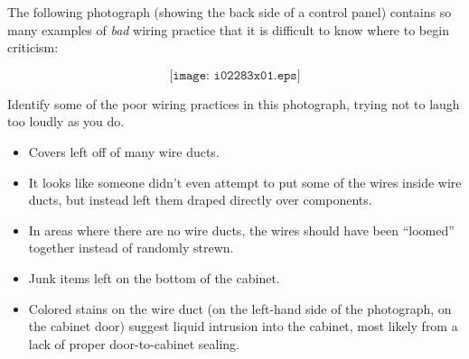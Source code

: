 

The following photograph (showing the back side of a control panel) contains so many examples of {\it bad} wiring practice that it is difficult to know where to begin criticism:

$$\texttt{[image: i02283x01.eps]}$$

Identify some of the poor wiring practices in this photograph, trying not to laugh too loudly as you do.







\begin{itemize}
\item{} Covers left off of many wire ducts.
\item{} It looks like someone didn't even attempt to put some of the wires inside wire ducts, but instead left them draped directly over components.
\item{} In areas where there are no wire ducts, the wires should have been ``loomed'' together instead of randomly strewn.
\item{} Junk items left on the bottom of the cabinet.
\item{} Colored stains on the wire duct (on the left-hand side of the photograph, on the cabinet door) suggest liquid intrusion into the cabinet, most likely from a lack of proper door-to-cabinet sealing.
\end{itemize}












